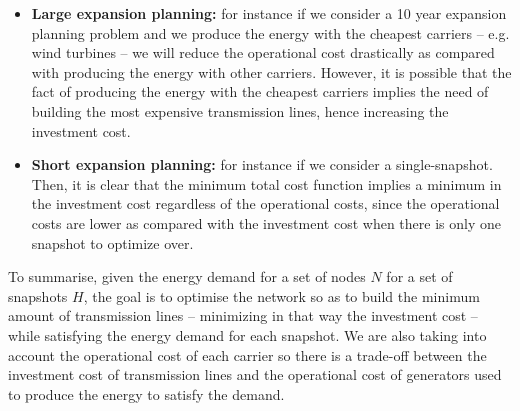 \begin{itemize}
    \item \textbf{Large expansion planning:} for instance if we consider a 10 year expansion planning problem and we produce the energy with the cheapest carriers -- e.g. wind turbines -- we will reduce the operational cost drastically as compared with producing the energy with other carriers. However, it is possible that the fact of producing the energy with the cheapest carriers implies the need of building the most expensive transmission lines, hence increasing the investment cost.
    \item \textbf{Short expansion planning:} for instance if we consider a single-snapshot.  Then, it is clear that the minimum total cost function implies a minimum in the investment cost regardless of the operational costs, since the operational costs are lower as compared with the investment cost when there is only one snapshot to optimize over.
\end{itemize}
To summarise, given the energy demand for a set of nodes $N$ for a set of snapshots $H$, the goal is to optimise the network so as to build the minimum amount of transmission lines -- minimizing in that way the investment cost -- while satisfying the energy demand for each snapshot. We are also taking into account the operational cost of each carrier so there is a trade-off between the investment cost of transmission lines and the operational cost of generators used to produce the energy to satisfy the demand.
\newpage
